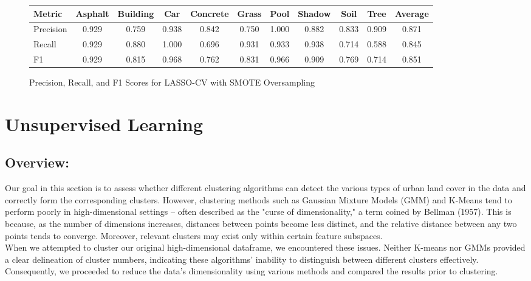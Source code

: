 \documentclass[11pt]{article}
\begin{document}
\begin{figure}
  \centering
  \begin{tabular}{lcccccccccc}
    \toprule
    Metric & Asphalt & Building & Car & Concrete & Grass & Pool & Shadow & Soil & Tree & Average \\
    \midrule
    Precision & 0.929 & 0.759 & 0.938 & 0.842 & 0.750 & 1.000 & 0.882 & 0.833 & 0.909 & 0.871 \\
    Recall & 0.929 & 0.880 & 1.000 & 0.696 & 0.931 & 0.933 & 0.938 & 0.714 & 0.588 & 0.845 \\
    F1 & 0.929 & 0.815 & 0.968 & 0.762 & 0.831 & 0.966 & 0.909 & 0.769 & 0.714 & 0.851 \\
    \bottomrule
  \end{tabular}
  \caption{Precision, Recall, and F1 Scores for LASSO-CV with SMOTE Oversampling}
  \label{tab:precision_recall_f1_transposed}
\end{figure}

\section{Unsupervised Learning}
\subsection{Overview:}
Our goal in this section is to assess whether different clustering algorithms can detect the various types of urban land cover in the data and correctly form the corresponding clusters. However, clustering methods such as Gaussian Mixture Models (GMM) and K-Means tend to perform poorly in high-dimensional settings – often described as the "curse of dimensionality," a term coined by Bellman (1957). This is because, as the number of dimensions increases, distances between points become less distinct, and the relative distance between any two points tends to converge. Moreover, relevant clusters may exist only within certain feature subspaces.\\
When we attempted to cluster our original high-dimensional dataframe, we encountered these issues. Neither K-means nor GMMs provided a clear delineation of cluster numbers, indicating these algorithms' inability to distinguish between different clusters effectively. Consequently, we proceeded to reduce the data's dimensionality using various methods and compared the results prior to clustering.
\end{document}
